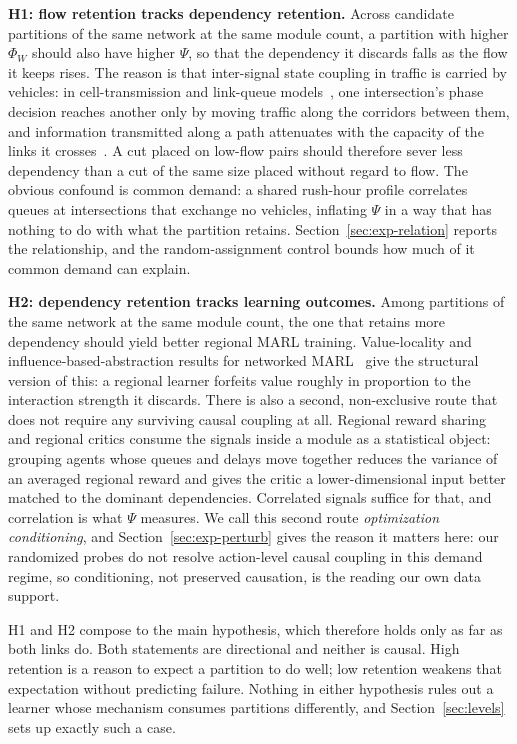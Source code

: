 \documentclass[journal]{IEEEtran}
\theoremstyle{definition}
\begin{document}
\noindent\textbf{H1: flow retention tracks dependency retention.}
Across candidate partitions of the same network at the same module count, a partition with higher $\Phi_W$ should also have higher $\Psi$, so that the dependency it discards falls as the flow it keeps rises. The reason is that inter-signal state coupling in traffic is carried by vehicles: in cell-transmission and link-queue models~\citep{daganzo1994ctm,jin2012linkqueue}, one intersection's phase decision reaches another only by moving traffic along the corridors between them, and information transmitted along a path attenuates with the capacity of the links it crosses~\citep{polyanskiy2017sdpi,evans1999percolation}. A cut placed on low-flow pairs should therefore sever less dependency than a cut of the same size placed without regard to flow. The obvious confound is common demand: a shared rush-hour profile correlates queues at intersections that exchange no vehicles, inflating $\Psi$ in a way that has nothing to do with what the partition retains. Section~\ref{sec:exp-relation} reports the relationship, and the random-assignment control bounds how much of it common demand can explain.

\noindent\textbf{H2: dependency retention tracks learning outcomes.}
Among partitions of the same network at the same module count, the one that retains more dependency should yield better regional MARL training. Value-locality and influence-based-abstraction results for networked MARL~\citep{qu2020average,qu2022scalable,congeduti2021iba} give the structural version of this: a regional learner forfeits value roughly in proportion to the interaction strength it discards. There is also a second, non-exclusive route that does not require any surviving causal coupling at all. Regional reward sharing and regional critics consume the signals inside a module as a statistical object: grouping agents whose queues and delays move together reduces the variance of an averaged regional reward and gives the critic a lower-dimensional input better matched to the dominant dependencies. Correlated signals suffice for that, and correlation is what $\Psi$ measures. We call this second route \emph{optimization conditioning}, and Section~\ref{sec:exp-perturb} gives the reason it matters here: our randomized probes do not resolve action-level causal coupling in this demand regime, so conditioning, not preserved causation, is the reading our own data support.

H1 and H2 compose to the main hypothesis, which therefore holds only as far as both links do. Both statements are directional and neither is causal. High retention is a reason to expect a partition to do well; low retention weakens that expectation without predicting failure. Nothing in either hypothesis rules out a learner whose mechanism consumes partitions differently, and Section~\ref{sec:levels} sets up exactly such a case.
\end{document}
